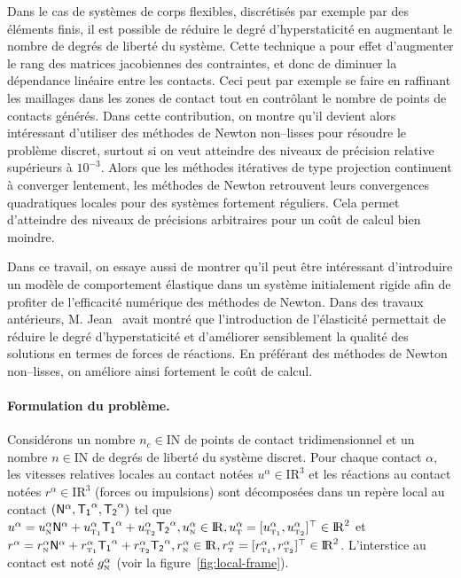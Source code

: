 \documentclass{CSMA2017}
\def\RR{\nbR}
\def\NN{\nbN}
\def\nbR{\ensuremath{\mathrm{I\!R}}} %
\def\nbN{\ensuremath{\mathrm{I\!N}}} %
\def\n{{\hbox{\tiny{N}}}}
\def\t{{\hbox{\tiny{T}}}}
\def\tone{{\hbox{\tiny{T}}}_{\hbox{\tiny{1}}}}
\def\ttwo{{\hbox{\tiny{T}}}_{\hbox{\tiny{2}}}}
\newcommand\ndm[1]{}
\begin{document}
Dans le cas de systèmes de corps flexibles, discrétisés par exemple par des éléments finis, il est possible de réduire le degré d'hyperstaticité en augmentant le nombre de degrés de liberté du système. Cette technique a pour effet d'augmenter le rang des matrices jacobiennes des contraintes, et donc de diminuer la dépendance linéaire entre les contacts. Ceci peut par exemple se faire en raffinant les maillages dans les zones de  contact tout en contrôlant le nombre de points de contacts générés.
%
Dans cette contribution, on montre qu'il devient alors intéressant d'utiliser des méthodes de Newton non--lisses pour résoudre le problème discret, surtout si on veut atteindre des niveaux de précision relative supérieurs à $10^{-3}$.  Alors que les méthodes itératives de type projection continuent à converger lentement, les méthodes de Newton retrouvent leurs convergences quadratiques locales pour des systèmes fortement réguliers. Cela permet d'atteindre des niveaux de précisions arbitraires pour un coût de calcul bien moindre.


Dans ce travail\ndm{{voir si on peut le faire. supprimer le paragraphe sinon}}, on essaye aussi de montrer qu'il peut être intéressant d'introduire un modèle de comportement élastique dans un système initialement rigide afin de profiter de l'efficacité numérique des méthodes de Newton. Dans des travaux antérieurs, M. Jean~\cite{Jean1999,Acary.Jean98} avait montré que l'introduction de l'élasticité permettait de réduire le degré d'hyperstaticité et d'améliorer sensiblement la qualité des solutions en termes de forces de réactions. En préférant des méthodes de Newton non--lisses, on améliore ainsi fortement le coût de calcul.


\paragraph{Formulation du problème.}
Considérons un nombre  $n_c\in \NN$ de points de contact tridimensionnel et un nombre   $n\in\NN$ de degrés de liberté du système discret. Pour chaque contact $\alpha$, les vitesses relatives locales au contact notées  $u^\alpha\in\RR^3$ et les réactions au contact notées $r^\alpha\in\RR^3$ (forces ou impulsions) sont décomposées dans un repère local au contact $({\sf N}^\alpha,{\sf T_1}^\alpha,{\sf T_2}^\alpha)$ tel que  $u^\alpha = u^\alpha_{\n} {\sf N}^\alpha +   u^{\alpha}_{\tone}{\sf T_1}^\alpha + u^{\alpha}_{\ttwo}{\sf T_2}^\alpha , u^\alpha_{\n} \in \RR, u^\alpha_{\t} = [u^{\alpha}_{\tone},u^{\alpha}_{\ttwo}]^\top \in \RR^2$ et  $r^\alpha = r^\alpha_{\n} {\sf N}^\alpha +   r^{\alpha}_{\tone}{\sf T_1}^\alpha + r^{\alpha}_{\ttwo}{\sf T_2}^\alpha  , r^\alpha_{\n} \in \RR, r^\alpha_{\t}=[r^{\alpha}_{\tone},r^{\alpha}_{\ttwo}]^\top \in \RR^2$. L'interstice au contact est noté $g_\n^\alpha$ (voir la figure~\ref{fig:local-frame}).
\end{document}

